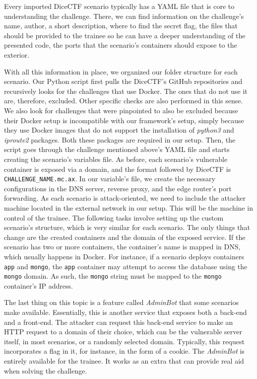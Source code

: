 Every imported DiceCTF scenario typically has a YAML file that is core to understanding the challenge. There, we can find information on the challenge's name, author, a short description, where to find the secret flag, the files that should be provided to the trainee so he can have a deeper understanding of the presented code, the ports that the scenario's containers should expose to the exterior.

With all this information in place, we organized our folder structure for each scenario. Our Python script first pulls the DiceCTF's GitHub repositories and recursively looks for the challenges that use Docker. The ones that do not use it are, therefore, excluded. Other specific checks are also performed in this sense. We also look for challenges that were pinpointed to also be excluded because their Docker setup is incompatible with our framework's setup, simply because they use Docker images that do not support the installation of \textit{python3} and \textit{iproute2} packages. Both these packages are required in our setup.
Then, the script goes through the challenge mentioned above's YAML file and starts creating the scenario's variables file. As before, each scenario's vulnerable container is exposed via a domain, and the format followed by DiceCTF is \texttt{{CHALLENGE\_NAME}.mc.ax}. In our variable's file, we create the necessary configurations in the DNS server, reverse proxy, and the edge router's port forwarding. As each scenario is attack-oriented, we need to include the attacker machine located in the external network in our setup. This will be the machine in control of the trainee. The following tasks involve setting up the custom scenario's structure, which is very similar for each scenario. The only things that change are the created containers and the domain of the exposed service. If the scenario has two or more containers, the container's name is mapped in DNS, which usually happens in Docker. For instance, if a scenario deploys containers \texttt{app} and \texttt{mongo}, the \texttt{app} container may attempt to access the database using the \texttt{mongo} domain. As such, the \texttt{mongo} string must be mapped to the \texttt{mongo} container's IP address.

The last thing on this topic is a feature called \textit{AdminBot} that some scenarios make available. Essentially, this is another service that exposes both a back-end and a front-end. The attacker can request this back-end service to make an HTTP request to a domain of their choice, which can be the vulnerable server itself, in most scenarios, or a randomly selected domain. Typically, this request incorporates a flag in it, for instance, in the form of a cookie. The \textit{AdminBot} is entirely available for the trainee. It works as an extra that can provide real aid when solving the challenge.

